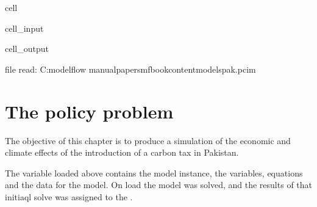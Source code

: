 \documentclass[letterpaper,10pt,english]{jupyterBook}
\begin{document}
\begin{sphinxuseclass}{cell}\begin{sphinxVerbatimInput}

\begin{sphinxuseclass}{cell_input}
\begin{sphinxVerbatim}[commandchars=\\\{\}]
  
\end{sphinxVerbatim}

\end{sphinxuseclass}\end{sphinxVerbatimInput}
\begin{sphinxVerbatimOutput}

\begin{sphinxuseclass}{cell_output}
\begin{sphinxVerbatim}[commandchars=\\\{\}]
file read:  C:\PYGZbs{}modelflow manual\PYGZbs{}papers\PYGZbs{}mfbook\PYGZbs{}content\PYGZbs{}models\PYGZbs{}pak.pcim
\end{sphinxVerbatim}

\end{sphinxuseclass}\end{sphinxVerbatimOutput}

\end{sphinxuseclass}

\section{The policy problem}
\label{\detokenize{content/05_WBModels/MoreComplexScenarios:the-policy-problem}}
\sphinxAtStartPar
The objective of this chapter is to produce a simulation of the economic and climate effects of the introduction of a carbon tax in Pakistan.

\sphinxAtStartPar
The variable  loaded above contains the model instance, the variables, equations and the data for the model.  On load the model was solved, and the results of that initiaql solve was assigned to the  .
\end{document}
